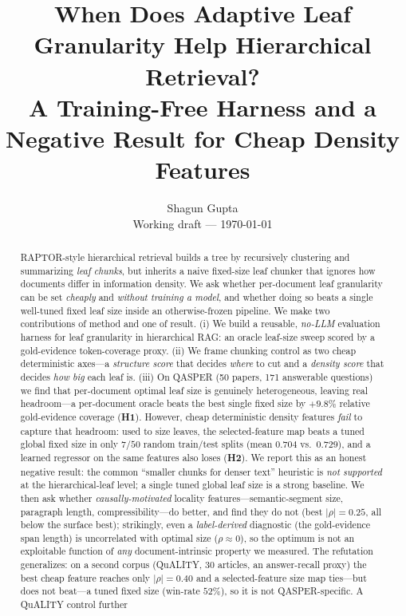 \documentclass[11pt]{article}
\title{\textbf{When Does Adaptive Leaf Granularity Help Hierarchical
Retrieval?}\\[2pt]
\large A Training-Free Harness and a Negative Result for Cheap Density Features}
\author{Shagun Gupta\\\small Working draft --- \today}
\date{}
\begin{document}
\maketitle

\begin{abstract}
RAPTOR-style hierarchical retrieval builds a tree by recursively clustering and
summarizing \emph{leaf chunks}, but inherits a naive fixed-size leaf chunker that
ignores how documents differ in information density. We ask whether per-document
leaf granularity can be set \emph{cheaply} and \emph{without training a model},
and whether doing so beats a single well-tuned fixed leaf size inside an
otherwise-frozen pipeline. We make two contributions of method and one of
result. (i) We build a reusable, \emph{no-LLM} evaluation harness for leaf
granularity in hierarchical RAG: an oracle leaf-size sweep scored by a
gold-evidence token-coverage proxy. (ii) We frame chunking control as two cheap
deterministic axes---a \emph{structure score} that decides \emph{where} to cut
and a \emph{density score} that decides \emph{how big} each leaf is. (iii) On
QASPER (50 papers, 171 answerable questions) we find that per-document optimal
leaf size is genuinely heterogeneous, leaving real headroom---a per-document
oracle beats the best single fixed size by $+9.8\%$ relative gold-evidence
coverage (\textbf{H1}). However, cheap deterministic density features
\emph{fail} to capture that headroom: used to size leaves, the
selected-feature map beats a tuned global fixed size in only $7/50$ random
train/test splits (mean $0.704$ vs.\ $0.729$), and a learned regressor on the
same features also loses (\textbf{H2}). We report this as an honest negative
result: the common ``smaller chunks for denser text'' heuristic is
\emph{not supported} at the hierarchical-leaf level; a single tuned global leaf
size is a strong baseline. We then ask whether \emph{causally-motivated}
locality features---semantic-segment size, paragraph length, compressibility---do
better, and find they do not (best $|\rho|=0.25$, all below the surface best);
strikingly, even a \emph{label-derived} diagnostic (the gold-evidence span length)
is uncorrelated with optimal size ($\rho\approx0$), so the optimum is not an
exploitable function of \emph{any} document-intrinsic property we measured. The
refutation generalizes: on a second corpus (QuALITY, $30$ articles, an
answer-recall proxy) the best cheap feature reaches only $|\rho|=0.40$ and a
selected-feature size map ties---but does not beat---a tuned fixed size
(win-rate $52\%$), so it is not QASPER-specific. A QuALITY control further

\end{abstract}
\end{document}

